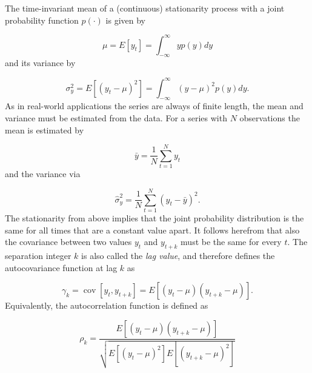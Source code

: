 The time-invariant mean of a (continuous) stationarity process with a joint probability function $p(\cdot)$ is given by

\begin{equation}
        \mu=E\left[y_{t}\right]=\int_{-\infty}^{\infty} y p(y) d y
\end{equation}
%
and its variance by

\begin{equation}
        \sigma_{y}^{2}=E\left[\left(y_{t}-\mu\right)^{2}\right]=\int_{-\infty}^{\infty}(y-\mu)^{2} p(y) d y.
\end{equation}
%
As in real-world applications the series are always of finite length, the mean and variance must be estimated from the data. For a series with $N$ observations the mean is estimated by

\begin{equation}
        \bar{y}=\frac{1}{N} \sum_{t=1}^{N} y_{t}
\end{equation}
%
and the variance via

\begin{equation}
        \hat{\sigma}_{y}^{2}=\frac{1}{N} \sum_{t=1}^{N}\left(y_{t}-\bar{y}\right)^{2}.
\end{equation}
%
The stationarity from above implies that the joint probability distribution is the same for all times that are a constant value apart. It follows herefrom that also the covariance between two values $y_t$ and $y_{t+k}$ must be the same for every $t$. The separation integer $k$ is also called the \textit{lag value}, and therefore defines the autocovariance function at lag $k$ as

\begin{equation}
        \gamma_{k}=\operatorname{cov}\left[y_{t}, y_{t+k}\right]=E\left[\left(y_{t}-\mu\right)\left(y_{t+k}-\mu\right)\right].
\end{equation}
%
Equivalently, the autocorrelation function is defined as

\begin{equation}
        \rho_{k}=\frac{E\left[\left(y_{t}-\mu\right)\left(y_{t+k}-\mu\right)\right]}{\sqrt{E\left[\left(y_{t}-\mu\right)^{2}\right] E\left[\left(y_{t+k}-\mu\right)^{2}\right]}}
\end{equation}












